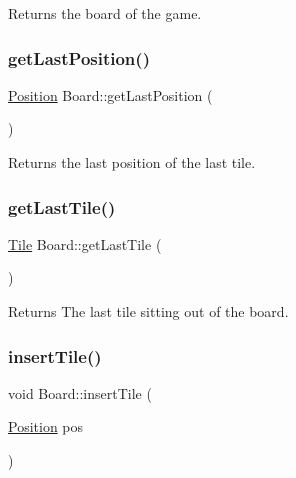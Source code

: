 \begin{DoxyReturn}{Returns}
the board of the game. 
\end{DoxyReturn}
\mbox{\label{classBoard_a31d74fd92f5ad77d4a8e58a8be8a7d3c}} 
\subsubsection{\texorpdfstring{getLastPosition()}{getLastPosition()}}
{\footnotesize\ttfamily \mbox{\hyperlink{structPosition}{Position}} Board\+::get\+Last\+Position (\begin{DoxyParamCaption}{ }\end{DoxyParamCaption})}

\begin{DoxyReturn}{Returns}
the last position of the last tile. 
\end{DoxyReturn}
\mbox{\label{classBoard_a4c413c90078b3a5bfed50a454ea53ffb}} 
\subsubsection{\texorpdfstring{getLastTile()}{getLastTile()}}
{\footnotesize\ttfamily \mbox{\hyperlink{classTile}{Tile}} Board\+::get\+Last\+Tile (\begin{DoxyParamCaption}{ }\end{DoxyParamCaption})}

\begin{DoxyReturn}{Returns}
The last tile sitting out of the board. 
\end{DoxyReturn}
\mbox{\label{classBoard_a1e0143b9611cab65161a2f5f0acd09ea}} 
\subsubsection{\texorpdfstring{insertTile()}{insertTile()}}
{\footnotesize\ttfamily void Board\+::insert\+Tile (\begin{DoxyParamCaption}\item[{\mbox{\hyperlink{structPosition}{Position}}}]{pos }\end{DoxyParamCaption})}

